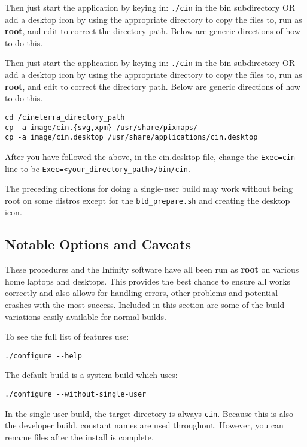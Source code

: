 Then just start the application by keying in: \texttt{./cin} in the
bin subdirectory OR add a desktop icon by using the appropriate
directory to copy the files to, run as \textbf{root}, and edit to
correct the directory path.  Below are generic directions of how to
do this.

Then just start the application by keying in: \texttt{./cin} in the
bin subdirectory OR add a desktop icon by using the appropriate
directory to copy the files to, run as \textbf{root}, and edit to
correct the directory path.  Below are generic directions of how to
do this.

\begin{lstlisting}[style=sh]
cd /cinelerra_directory_path
cp -a image/cin.{svg,xpm} /usr/share/pixmaps/
cp -a image/cin.desktop /usr/share/applications/cin.desktop
\end{lstlisting}

After you have followed the above, in the cin.desktop file, change
the \texttt{Exec=cin} line to be
\texttt{Exec=<your\_directory\_path>/bin/cin}.

The preceding directions for doing a single-user build may work
without being root on some distros except for the \texttt{bld\_prepare.sh}
and creating the desktop icon.


\subsection{Notable Options and Caveats}%
\label{sub:notable_options_and_caveats}

These procedures and the \CGG{} Infinity software have all been run
as \textbf{root} on various home laptops and desktops. This provides
the best chance to ensure all works correctly and also allows for
handling errors, other problems and potential crashes with the most
success.  Included in this section are some of the build variations
easily available for normal builds.

To see the full list of features use:

\begin{lstlisting}[style=sh]
./configure --help
\end{lstlisting}
The default build is a system build which uses:

\begin{lstlisting}[style=sh]
./configure --without-single-user
\end{lstlisting}

In the single-user build, the target directory is always
\texttt{cin}.  Because this is also the developer build, constant
names are used throughout.  However, you can rename files after the
install is complete.

